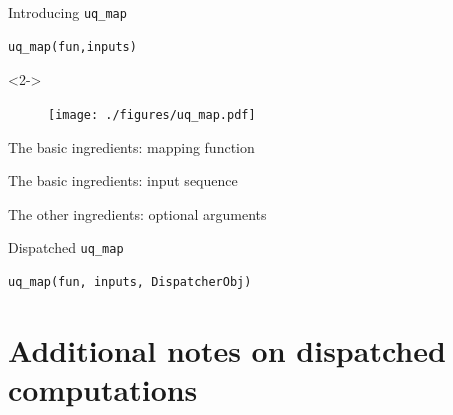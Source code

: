 \documentclass[]{rsuqbeamernew}
\begin{document}
\begin{frame}[fragile]{Introducing \texttt{uq\_map}}

\begin{lstlisting}[basicstyle=\large,numbers=none]
uq_map(fun,inputs)
\end{lstlisting}

\begin{onslide}<2->
  \begin{figure}[htbp]
  \centering
  \texttt{[image: ./figures/uq\_map.pdf]}
\end{figure}
\end{onslide}
  


\end{frame}


\begin{frame}[fragile]{The basic ingredients: mapping function}
\end{frame}

\begin{frame}[fragile]{The basic ingredients: input sequence}
\end{frame}

\begin{frame}[fragile]{The other ingredients: optional arguments}
\end{frame}

\begin{frame}[fragile]{Dispatched \texttt{uq\_map}}
\begin{lstlisting}[basicstyle=\large,numbers=none]
uq_map(fun, inputs, DispatcherObj)
\end{lstlisting}
\end{frame}

\section{Additional notes on dispatched computations}
\end{document}
